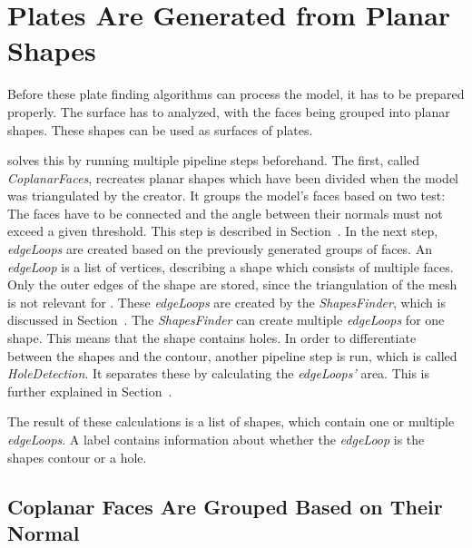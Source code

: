 \documentclass[../ClassicThesis.tex]{subfiles}
\begin{document}
\section{Plates Are Generated from Planar Shapes}

Before these plate finding algorithms can process the model, it has to be prepared properly. The surface has to analyzed, with the faces being grouped into planar shapes. These shapes can be used as surfaces of plates. 

{\platener} solves this by running multiple pipeline steps beforehand. The first, called \emph{CoplanarFaces}, recreates planar shapes which have been divided when the model was triangulated by the creator. It groups the model's faces based on two test: The faces have to be connected and the angle between their normals must not exceed a given threshold. This step is described in Section~. In the next step, \emph{edgeLoops} are created based on the previously generated groups of faces. An \emph{edgeLoop} is a list of vertices, describing a shape which consists of multiple faces. Only the outer edges of the shape are stored, since the triangulation of the mesh is not relevant for \platener{}. These \emph{edgeLoops} are created by the \emph{ShapesFinder}, which is discussed in Section~. The \emph{ShapesFinder} can create multiple \emph{edgeLoops} for one shape. This means that the shape contains holes. In order to differentiate between the shapes and the contour, another pipeline step is run, which is called \emph{HoleDetection}. It separates these by calculating the \emph{edgeLoops'} area. This is further explained in Section~.

The result of these calculations is a list of shapes, which contain one or multiple \emph{edgeLoops}. A label contains information about whether the \emph{edgeLoop} is the shapes contour or a hole.

\subsection{Coplanar Faces Are Grouped Based on Their Normal}\label{sub:coplanarfaces}
\end{document}
